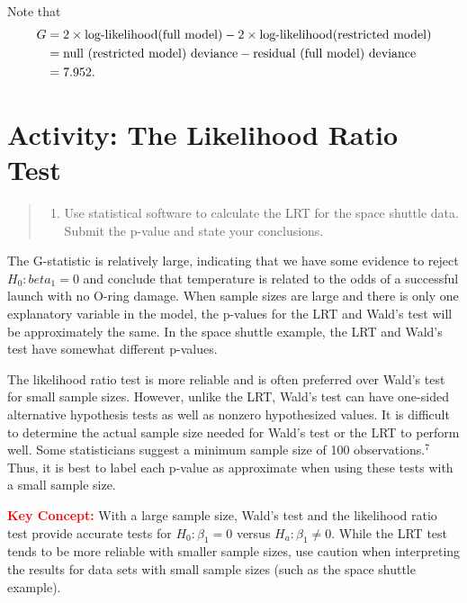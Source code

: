 \documentclass[
]{report}
\providecommand{\tightlist}{%
  \setlength{\itemsep}{0pt}\setlength{\parskip}{0pt}}
\begin{document}
Note that
\begin{align}
G &= 2 \times \text{log-likelihood(full model)} - 2 \times \text{log-likelihood(restricted model)} \notag \\
&= \text{null (restricted model) deviance} - \text{residual (full model) deviance} \notag \\
&= 7.952. \notag 
\end{align}

\hypertarget{activity-the-likelihood-ratio-test}{%
\section*{Activity: The Likelihood Ratio Test}\label{activity-the-likelihood-ratio-test}}

\begin{quote}
\begin{enumerate}
\def\labelenumi{\arabic{enumi}.}
\setcounter{enumi}{13}
\tightlist
\item
  Use statistical software to calculate the LRT for the space shuttle data. Submit the p-value and state your conclusions.
\end{enumerate}
\end{quote}

The G-statistic is relatively large, indicating that we have some evidence to reject \(H_0: beta_1 = 0\) and conclude that temperature is related to the odds of a successful launch with no O-ring damage. When sample sizes are large and there is only one explanatory variable in the model, the p-values for the LRT and Wald's test will be approximately the same. In the space shuttle example, the LRT and Wald's test have somewhat different p-values.

The likelihood ratio test is more reliable and is often preferred over Wald's test for small sample sizes. However, unlike the LRT, Wald's test can have one-sided alternative hypothesis tests as well as nonzero hypothesized values. It is difficult to determine the actual sample size needed for Wald's test or the LRT to perform well. Some statisticians suggest a minimum sample size of 100 observations.\(^7\) Thus, it is best to label each p-value as approximate when using these tests with a small sample size.

\Large

\textbf{\textcolor{red}{Key Concept:}}
\color{red}
With a large sample size, Wald's test and the likelihood ratio test provide accurate tests for \(H_0: \beta_1 = 0\) versus \(H_a: \beta_1 \neq 0\). While the LRT test tends to be more reliable with smaller sample sizes, use caution when interpreting the results for data sets with small sample sizes (such as the space shuttle example).
\color{black}
\normalsize
\end{document}
